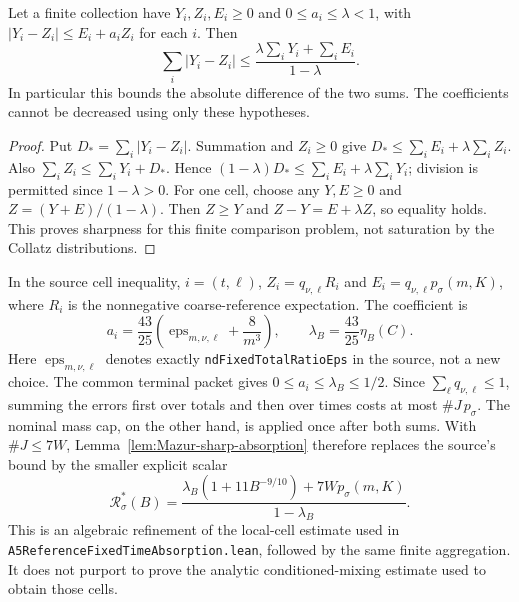 \begin{lemma}
\label{lem:Mazur-sharp-absorption}
Let a finite collection have $Y_i,Z_i,E_i\ge0$ and
$0\le a_i\le\lambda<1$, with
$|Y_i-Z_i|\le E_i+a_iZ_i$ for each $i$. Then
\[
 \sum_i|Y_i-Z_i|
 \le\frac{\lambda\sum_iY_i+\sum_iE_i}{1-\lambda}.
 \label{eq:Mazur-sharp-absorption}
\]
In particular this bounds the absolute difference of the two sums.
The coefficients cannot be decreased using only these hypotheses.
\end{lemma}
\begin{proof}
Put $D_*=\sum_i|Y_i-Z_i|$. Summation and $Z_i\ge0$ give
$D_*\le\sum_iE_i+\lambda\sum_iZ_i$.
Also $\sum_iZ_i\le\sum_iY_i+D_*$.
Hence $(1-\lambda)D_*\le\sum_iE_i+\lambda\sum_iY_i$;
division is permitted since $1-\lambda>0$.
For one cell, choose any $Y,E\ge0$ and $Z=(Y+E)/(1-\lambda)$.
Then $Z\ge Y$ and $Z-Y=E+\lambda Z$, so equality holds.
This proves sharpness for this finite comparison problem, not
saturation by the Collatz distributions.
\end{proof}

In the source cell inequality,
$i=(t,\ell)$, $Z_i=q_{\nu,\ell}R_i$ and
$E_i=q_{\nu,\ell}p_\sigma(m,K)$, where $R_i$ is the nonnegative
coarse-reference expectation. The coefficient is
\[
 a_i=\frac{43}{25}
   \left(\operatorname{eps}_{m,\nu,\ell}+\frac8{m^3}\right),
 \qquad
 \lambda_B=\frac{43}{25}\eta_B(C).
\]
Here $\operatorname{eps}_{m,\nu,\ell}$ denotes exactly
\texttt{ndFixedTotalRatioEps} in the source, not a new choice.
The common terminal packet gives $0\le a_i\le\lambda_B\le1/2$.
Since $\sum_\ell q_{\nu,\ell}\le1$, summing the errors first over
totals and then over times costs at most $\#J\,p_\sigma$.
The nominal mass cap, on the other hand, is applied once after
both sums. With $\#J\le7W$, Lemma~\ref{lem:Mazur-sharp-absorption}
therefore replaces the source's bound by the smaller explicit scalar
\[
 \mathcal R_\sigma^*(B)=
 \frac{\lambda_B(1+11B^{-9/10})+7W p_\sigma(m,K)}
      {1-\lambda_B}.
 \label{eq:Mazur-sharp-terminal}
\]
This is an algebraic refinement of the local-cell estimate
used in \texttt{A5ReferenceFixedTimeAbsorption.lean}, followed
by the same finite aggregation. It does not purport to prove
the analytic conditioned-mixing estimate used to obtain those cells.


